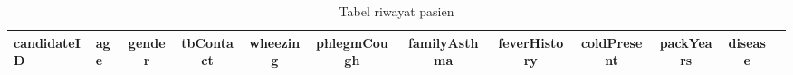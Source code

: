 \begin{landscape}
\begin{longtable}{p{3cm}lcccccccccc}
\caption{Tabel riwayat pasien}\\
\hline
\textbf{candidateID} & \textbf{age} & \textbf{gender} & \textbf{tbContact} & \textbf{wheezing} & \textbf{phlegmCough} & \textbf{familyAsthma} & \textbf{feverHistory} & \textbf{coldPresent} & \textbf{packYears} & \textbf{disease} \\ \hline






\end{longtable}
\end{landscape}
